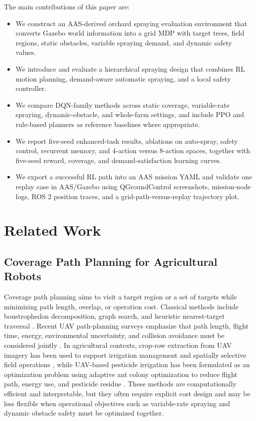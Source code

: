 \documentclass[conference,10pt]{IEEEtran}
\begin{document}
The main contributions of this paper are:
\begin{itemize}
\item We construct an AAS-derived orchard spraying evaluation environment that converts Gazebo world information into a grid MDP with target trees, field regions, static obstacles, variable spraying demand, and dynamic safety values.
\item We introduce and evaluate a hierarchical spraying design that combines RL motion planning, demand-aware automatic spraying, and a local safety controller.
\item We compare DQN-family methods across static coverage, variable-rate spraying, dynamic-obstacle, and whole-farm settings, and include PPO and rule-based planners as reference baselines where appropriate.
\item We report five-seed enhanced-task results, ablations on auto-spray, safety control, recurrent memory, and 4-action versus 8-action spaces, together with five-seed reward, coverage, and demand-satisfaction learning curves.
\item We export a successful RL path into an AAS mission YAML and validate one replay case in AAS/Gazebo using QGroundControl screenshots, mission-node logs, ROS 2 position traces, and a grid-path-versus-replay trajectory plot.
\end{itemize}

\section{Related Work}
\subsection{Coverage Path Planning for Agricultural Robots}
Coverage path planning aims to visit a target region or a set of targets while minimizing path length, overlap, or operation cost. Classical methods include boustrophedon decomposition, graph search, and heuristic nearest-target traversal \cite{choset2001coverage,galceran2013survey}. Recent UAV path-planning surveys emphasize that path length, flight time, energy, environmental uncertainty, and collision avoidance must be considered jointly \cite{kumar_uav_survey}. In agricultural contexts, crop-row extraction from UAV imagery has been used to support irrigation management and spatially selective field operations \cite{ronchetti2020crop}, while UAV-based pesticide irrigation has been formulated as an optimization problem using adaptive ant colony optimization to reduce flight path, energy use, and pesticide residue \cite{gao2021aco}. These methods are computationally efficient and interpretable, but they often require explicit cost design and may be less flexible when operational objectives such as variable-rate spraying and dynamic obstacle safety must be optimized together.
\end{document}
